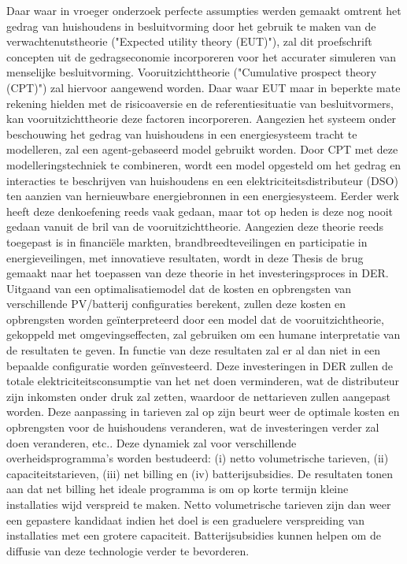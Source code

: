 \documentclass[master=ene,english]{kulemt}
\begin{document}
\begin{abstract*}
 Daar waar in vroeger onderzoek perfecte assumpties werden gemaakt omtrent het gedrag van huishoudens in besluitvorming door het gebruik te maken van de verwachtenutstheorie ("Expected utility theory (EUT)"), zal dit proefschrift concepten uit de gedragseconomie incorporeren voor het accurater simuleren van menselijke besluitvorming. Vooruitzichttheorie ("Cumulative prospect theory (CPT)") zal hiervoor aangewend worden. Daar waar EUT maar in beperkte mate rekening hielden met de risicoaversie en de referentiesituatie van besluitvormers, kan vooruitzichttheorie deze factoren incorporeren. Aangezien het systeem onder beschouwing het gedrag van huishoudens in een energiesysteem tracht te modelleren, zal een agent-gebaseerd model gebruikt worden. Door CPT met deze modelleringstechniek te combineren, wordt een model opgesteld om het gedrag en interacties te beschrijven van huishoudens en een elektriciteitsdistributeur (DSO) ten aanzien van hernieuwbare energiebronnen in een energiesysteem. Eerder werk heeft deze denkoefening reeds vaak gedaan, maar tot op heden is deze nog nooit gedaan vanuit de bril van de vooruitzichttheorie. Aangezien deze theorie reeds toegepast is in financi\"{e}le markten, brandbreedteveilingen en participatie in energieveilingen, met innovatieve resultaten, wordt in deze Thesis de brug gemaakt naar het toepassen van deze theorie in het investeringsproces in DER.
 \newline \noindent
 Uitgaand van een optimalisatiemodel dat de kosten en opbrengsten van verschillende PV/batterij configuraties berekent, zullen deze kosten en opbrengsten worden ge\"{i}nterpreteerd door een model dat de vooruitzichtheorie, gekoppeld met omgevingseffecten, zal gebruiken om een humane  interpretatie van de resultaten te geven. In functie van deze resultaten zal er al dan niet in een bepaalde configuratie worden ge\"{i}nvesteerd. Deze investeringen in DER zullen de totale elektriciteitsconsumptie van het net doen verminderen, wat de distributeur zijn inkomsten onder druk zal zetten, waardoor de nettarieven zullen aangepast worden. Deze aanpassing in tarieven zal op zijn beurt weer de optimale kosten en opbrengsten voor de huishoudens veranderen, wat de investeringen verder zal doen veranderen, etc.. Deze dynamiek zal voor verschillende overheidsprogramma's worden bestudeerd: (i) netto volumetrische tarieven, (ii) capaciteitstarieven, (iii) net billing en (iv) batterijsubsidies. De resultaten tonen aan dat net billing het ideale programma is om op korte termijn kleine installaties wijd verspreid te maken. Netto volumetrische tarieven zijn dan weer een gepastere kandidaat indien het doel is een graduelere verspreiding van installaties met een grotere capaciteit. Batterijsubsidies kunnen helpen om de diffusie van deze technologie verder te bevorderen. 

\end{abstract*}
\end{document}
